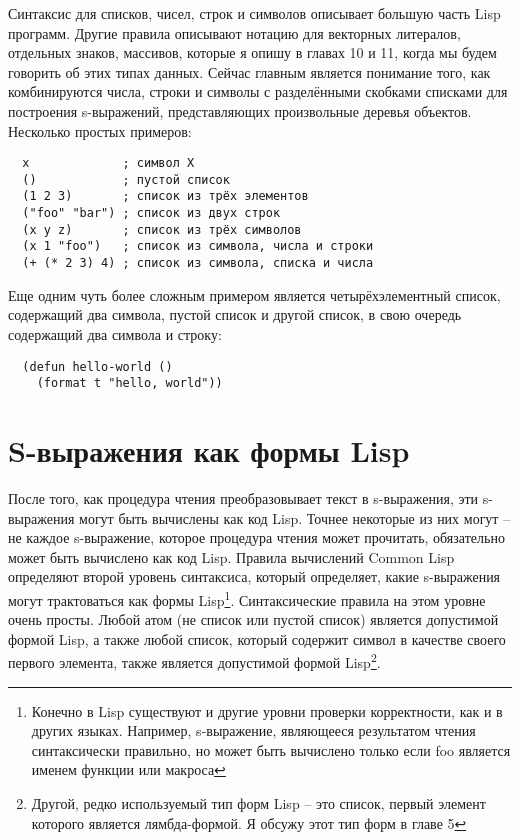 Синтаксис для списков, чисел, строк и символов описывает большую часть Lisp
программ. Другие правила описывают нотацию для векторных литералов, отдельных знаков,
массивов, которые я опишу в главах 10 и 11, когда мы будем говорить об этих типах
данных. Сейчас главным является понимание того, как комбинируются числа, строки и символы
с разделёнными скобками списками для построения s-выражений, представляющих произвольные
деревья объектов. Несколько простых примеров:

\begin{verbatim}
  x             ; символ X
  ()            ; пустой список
  (1 2 3)       ; список из трёх элементов
  ("foo" "bar") ; список из двух строк
  (x y z)       ; список из трёх символов
  (x 1 "foo")   ; список из символа, числа и строки
  (+ (* 2 3) 4) ; список из символа, списка и числа
\end{verbatim}

Еще одним чуть более сложным примером является четырёхэлементный список, содержащий два
символа, пустой список и другой список, в свою очередь содержащий два символа и строку:

\begin{lstlisting}
  (defun hello-world ()
    (format t "hello, world"))
\end{lstlisting}

\section{S-выражения как формы Lisp}

После того, как процедура чтения преобразовывает текст в s-выражения, эти s-выражения
могут быть вычислены как код Lisp. Точнее некоторые из них могут -- не каждое s-выражение,
которое процедура чтения может прочитать, обязательно может быть вычислено как код
Lisp. Правила вычислений Common Lisp определяют второй уровень синтаксиса, который
определяет, какие s-выражения могут трактоваться как формы Lisp\footnote{Конечно в Lisp
  существуют и другие уровни проверки корректности, как и в других языках. Например,
  s-выражение, являющееся результатом чтения  синтаксически правильно, но
  может быть вычислено только если foo является именем функции или
  макроса}. Синтаксические правила на этом уровне очень просты. Любой атом (не список или
пустой список) является допустимой формой Lisp, а также любой список, который содержит
символ в качестве своего первого элемента, также является допустимой формой
Lisp\footnote{Другой, редко используемый тип форм Lisp -- это список, первый элемент
  которого является лямбда-формой. Я обсужу этот тип форм в главе 5}.

